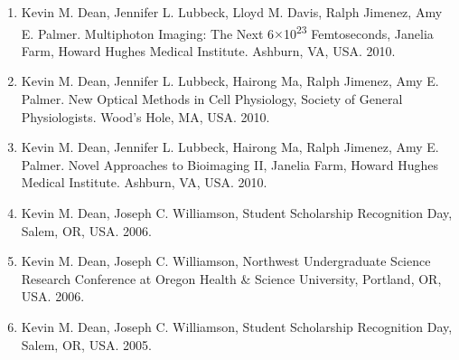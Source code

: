 \begin{enumerate}
\item Kevin M. Dean, Jennifer L. Lubbeck, Lloyd M. Davis, Ralph Jimenez, Amy E. Palmer.  Multiphoton Imaging: The Next 6$\times$10\textsuperscript{23} Femtoseconds, Janelia Farm, Howard Hughes Medical Institute.  Ashburn, VA, USA. 2010.
\item Kevin M. Dean, Jennifer L. Lubbeck, Hairong Ma, Ralph Jimenez, Amy E. Palmer.  New Optical Methods in Cell Physiology, Society of General Physiologists. Wood's Hole, MA, USA. 2010.
\item Kevin M. Dean, Jennifer L. Lubbeck, Hairong Ma, Ralph Jimenez, Amy E. Palmer.  Novel Approaches to Bioimaging II, Janelia Farm, Howard Hughes Medical Institute.  Ashburn, VA, USA. 2010.
\item Kevin M. Dean, Joseph C. Williamson, Student Scholarship Recognition Day, Salem, OR, USA. 2006.
\item Kevin M. Dean, Joseph C. Williamson, Northwest Undergraduate Science Research Conference at Oregon Health \& Science University, Portland, OR, USA. 2006.
\item Kevin M. Dean, Joseph C. Williamson, Student Scholarship Recognition Day, Salem, OR, USA. 2005. 
\end{enumerate}